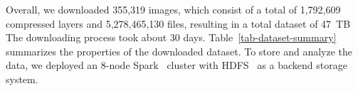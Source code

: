 Overall, we downloaded 355,319 images, which consist of a total of 1,792,609
compressed layers and 5,278,465,130 files, resulting in a total dataset
of 47~TB
The downloading process took about 30 days.
%
%
Table~\ref{tab-dataset-summary} summarizes the properties of the downloaded
dataset.
%
%
%
To store and analyze the data, we deployed an 8-node Spark~\cite{xxx}
cluster with HDFS~\cite{xxx} as a backend storage system.
%

